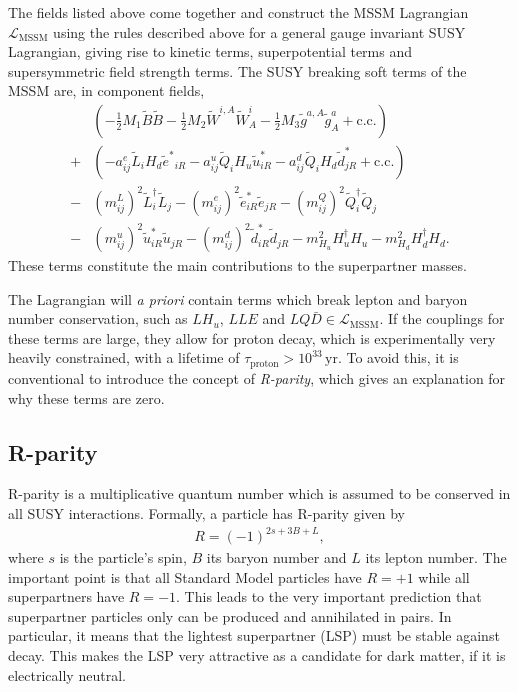The fields listed above come together and construct the MSSM Lagrangian $\mathcal{L}_\mathrm{MSSM}$ using the rules described above for a general gauge invariant SUSY Lagrangian, giving rise to kinetic terms, superpotential terms and supersymmetric field strength terms. The SUSY breaking soft terms of the MSSM are, in component fields,
\begin{align}
	&\left( -\frac{1}{2}M_1 \tilde B \tilde B - \frac{1}{2}M_2 \tilde W^{i,A} \tilde W^i_A - \frac{1}{2}M_3 \tilde g^{a,A}\tilde g^a_A + \mathrm{c.c.} \right)\nonumber\\
	+ &\left(-a_{ij}^e \tilde L_i H_d {\tilde e^*}_{iR} - a_{ij}^u \tilde Q_i H_u \tilde u^*_{iR} - a_{ij}^d \tilde Q_i H_d \tilde d^*_{jR} + \mathrm{c.c.} \right)\\
	- &(m_{ij}^L)^2 \tilde L_i^\dag \tilde L_j - (m_{ij}^e)^2 {\tilde e_{iR}^*} {\tilde e_{jR}} - (m_{ij}^Q)^2 \tilde Q_i^\dag \tilde Q_j \nonumber \\
	- &(m_{ij}^u)^2 {\tilde u_{iR}^*} {\tilde u_{jR}} - (m_{ij}^d)^2 {\tilde d_{iR}^*} {\tilde d_{jR}} - m^2_{H_u} H^\dag_u H_u - m^2_{H_d} H^\dag_d H_d.\nonumber
\end{align}
These terms constitute the main contributions to the superpartner masses.

The Lagrangian will {\it a priori} contain terms which break lepton and baryon number conservation, such as $LH_u$, $LLE$ and $LQ\bar D \in \mathcal{L}_\mathrm{MSSM}$. If the couplings for these terms are large, they allow for proton decay, which is experimentally very heavily constrained, with a lifetime of $\tau_\mathrm{proton} > 10^{33} \,\mathrm{yr}$. To avoid this, it is conventional to introduce the concept of {\it R-parity}, which gives an explanation for why these terms are zero.

\subsection{R-parity}
R-parity is a multiplicative quantum number which is assumed to be conserved in all SUSY interactions. Formally, a particle has R-parity given by
\begin{align}
	R = (-1)^{2s + 3B + L},
\end{align}
where $s$ is the particle's spin, $B$ its baryon number and $L$ its lepton number. The important point is that all Standard Model particles have $R=+1$ while all superpartners have $R = -1$. This leads to the very important prediction that superpartner particles only can be produced and annihilated in pairs. In particular, it means that the lightest superpartner (LSP) must be stable against decay. This makes the LSP very attractive as a candidate for dark matter, if it is electrically neutral.

